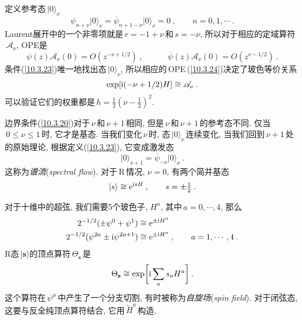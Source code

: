 定义参考态$\,\lvert 0\rangle_{\nu}\,$
\begin{equation}
    \psi_{n+\nu}\lvert 0\rangle_{\nu} = \overline{\psi}_{n+1-\nu}\lvert 0\rangle_{\nu}=0\:,\qquad
    n=0,1,\cdots\:. \label{10.3.23}
\end{equation}
Laurent展开中的一个非零项就是$\,r=-1+\nu\,$和$\,s=-\nu$, 所以对于相应的定域算符$\,\mathscr{A}_{\nu}$, OPE是
\begin{equation}
    \psi(z)\mathscr{A}_{\nu}(0)=O(z^{-\nu+1/2})\:, \qquad  \quad
    \overline{\psi}(z)\mathscr{A}_{\nu}(0) = O(z^{\nu-1/2})\:. \label{10.3.24}
\end{equation}
条件(\ref{10.3.23})唯一地找出态$\,\lvert 0\rangle_{\nu}$, 所以相应的\,OPE\,(\ref{10.3.24})决定了玻色等价关系
\begin{equation}
    \exp[\mathrm{i}(-\nu+1/2)H]\cong \mathscr{A}_{\nu} \:. \label{10.3.25}
\end{equation}
可以验证它们的权重都是$\,h=\tfrac{1}{2}(\nu-\tfrac{1}{2})^{2}$.

边界条件(\ref{10.3.20})对于$\,\nu\,$和$\,\nu+1\,$相同, 但是$\,\nu\,$和$\,\nu+1\,$的参考态不同. 仅当$\,0\leq\nu\leq1\,$时, 它才是基态. 当我们变化$\,\nu\,$时, 态$\,\lvert 0\rangle_{\nu}\,$连续变化, 当我们回到$\,\nu+1\,$处的原始理论, 根据定义(\ref{10.3.23}), 它变成激发态
\begin{equation}
    \lvert 0\rangle_{\nu+1} =\overline{\psi}_{-\nu}\lvert 0\rangle_{\nu} \:. \label{10.3.26}
\end{equation}
这称为{\emph{谱流}}(\emph{spectral flow}). 对于\,R\,情况, $\nu=0$, 有两个简并基态
\begin{equation}
    \lvert s\rangle \cong \mathrm{e}^{\mathrm{i} s H} \:, \qquad s=\pm\tfrac{1}{2} \:. \label{10.3.27}
\end{equation}

对于十维中的超弦, 我们需要5个玻色子, $H^{a}$, 其中$\,a=0,\cdots,4$, 那么
\begin{subequations}
\begin{align}
    2^{-1/2}(\pm\psi^{0}+\psi^{1}) &\cong \mathrm{e}^{\pm\mathrm{i} H^{0}} \label{10.3.28a}\\
    2^{-1/2}(\psi^{2a}\pm \mathrm{i}\psi^{2a+1}) &\cong \mathrm{e}^{\pm\mathrm{i} H^{a}} \:, \qquad a=1,\cdots,4\:. \label{10.3.28b}
\end{align} \label{10.3.28}
\end{subequations}
R态$\,\lvert \mathbf{s}\rangle$的顶点算符$\,\Theta_{\mathbf{s}}\,$是
\begin{equation}
    \Theta_{\mathbf{s}}\cong \exp\biggl[\mathrm{i}\sum_{a}s_{a}H^{a}\biggr] \:. \label{10.3.29}
\end{equation}
这个算符在$\,\psi^{\mu}\,$中产生了一个分支切割, 有时被称为{\emph{自旋场}}(\emph{spin field}). 对于闭弦态, 这要与反全纯顶点算符结合, 它用$\,\tilde{H}^{a}\,$构造.

